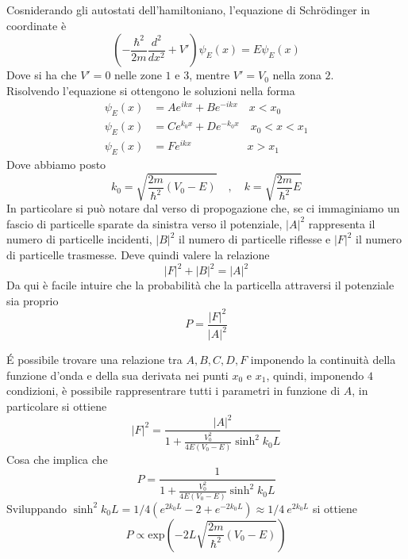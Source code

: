 Cosniderando gli autostati dell'hamiltoniano, l'equazione di Schrödinger in coordinate è 
%
\begin{equation}
    \left( -\frac{\hbar^2}{2 m} \frac{d^2}{dx^2} + V'\right) \psi_E(x) = E \psi_E(x)
\end{equation}
Dove si ha che $V' = 0$ nelle zone $1$ e $3$, mentre $V' = V_0$ nella zona $2$. \\
Risolvendo l'equazione si ottengono le soluzioni nella forma 
%
\begin{align}
    \psi_E(x) &= Ae^{ikx} + Be^{-ikx} \quad x < x_0\\
    \psi_E(x) &= Ce^{k_0 x} + D e^{- k_0 x} \quad x_0 < x < x_1\\
    \psi_E(x) &= Fe^{i k x} \quad \qquad \qquad x > x_1 
\end{align}
Dove abbiamo posto 
%
\begin{equation}
    k_0 = \sqrt{\frac{2m}{\hbar^2} (V_0 - E)} \quad, \quad k = \sqrt{\frac{2m}{\hbar^2}E}
\end{equation}
In particolare si può notare dal verso di propogazione che, se ci immaginiamo un fascio di particelle sparate da sinistra verso il potenziale, $|A|^2$ rappresenta il numero di particelle incidenti, $|B|^2$ il numero di particelle riflesse e $|F|^2$ il numero di particelle trasmesse. Deve quindi valere la relazione 
%
\begin{equation*}
    |F|^2 + |B|^2= |A|^2
\end{equation*}
Da qui è facile intuire che la probabilità che la particella attraversi il potenziale sia proprio 
%
\begin{equation}
    P = \frac{|F|^2}{|A|^2}
\end{equation}

\'E possibile trovare una relazione tra $A, B, C, D, F$ imponendo la continuità della funzione d'onda e della sua derivata nei punti $x_0$ e $x_1$, quindi, imponendo $4$ condizioni, è possibile rappresentrare tutti i parametri in funzione di $A$, in particolare si ottiene 
%
\begin{equation*}
    |F|^2 = \frac{|A|^2}{1+\frac{V_0^2}{4 E\left(V_0-E\right)} \sinh ^2 k_0 L}
\end{equation*}
Cosa che implica che 
\begin{equation*}
    P = \frac{1}{1+\frac{V_0^2}{4 E\left(V_0-E\right)} \sinh ^2 k_0 L}
\end{equation*}
Sviluppando $\sinh^2 k_0 L = 1/4 (e^{2 k_0 L} - 2 + e^{-2k_0 L}) \approx 1/4 \ e^{2 k_0 L}$ si ottiene
\begin{equation}
    P \propto \text{exp}\left( -2 L \sqrt{\frac{2m}{\hbar^2} (V_0 - E)} \right)
\end{equation}

